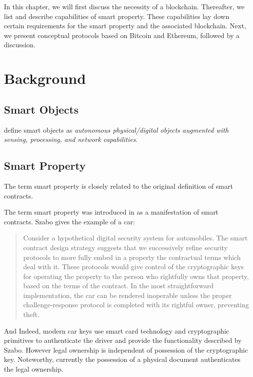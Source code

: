 In this chapter, we will first discuss the necessity of a blockchain. Thereafter, we list and describe capabilities of smart property. These capabilities lay down certain requirements for the smart property and the associated blockchain. Next, we present conceptual protocols based on Bitcoin and Ethereum, followed by a discussion.

\section{Background}

\subsection{Smart Objects}

\cite{kortuem2010smart} define smart objects as \emph{autonomous physical/digital objects augmented with sensing, processing, and network capabilities}. 

\subsection{Smart Property}

The term smart property is closely related to the original definition of smart contracts. 

The term smart property was introduced in \cite{szabo1997} as a manifestation of smart contracts. Szabo gives the example of a car:
\begin{quote}
Consider a hypothetical digital security system for automobiles. The smart contract design strategy suggests that we successively refine security protocols to more fully embed in a property the contractual terms which deal with it. These protocols would give control of the cryptographic keys for operating the property to the person who rightfully owns that property, based on the terms of the contract. In the most straightforward implementation, the car can be rendered inoperable unless the proper challenge-response protocol is completed with its rightful owner, preventing theft.
\end{quote}

And Indeed, modern car keys use smart card technology and cryptographic primitives to authenticate the driver and provide the functionality described by Szabo. However legal ownership is independent of possession of the cryptographic key. Noteworthy, currently the possession of a physical document authenticates the legal ownership. 

